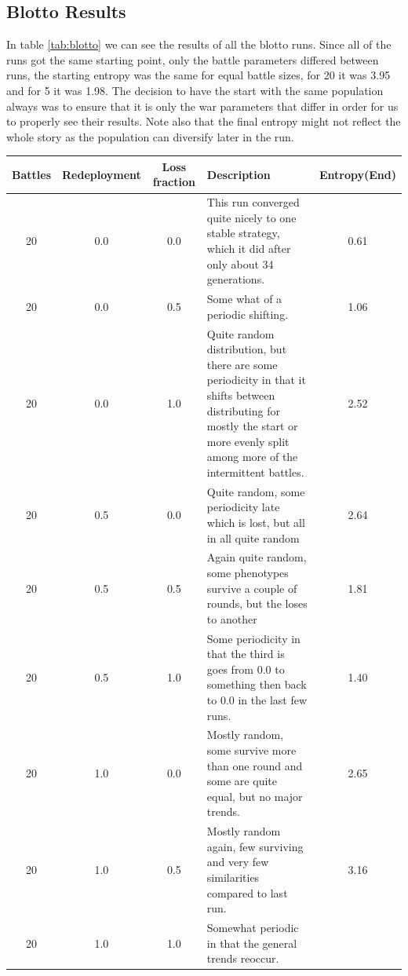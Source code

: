 \subsection{Blotto Results}\label{sec:blotto results}
In table \ref{tab:blotto} we can see the results of all the blotto runs.
Since all of the runs got the same starting point, only the battle parameters
differed between runs, the starting entropy was the same for equal battle sizes,
for 20 it was 3.95 and for 5 it was 1.98. The decision
to have the start with the same population always was to ensure that it is only
the war parameters that differ in order for us to properly see their results.
Note also that the final entropy might not reflect the whole story as the
population can diversify later in the run.

\begin{landscape}
	\begin{table}
		\begin{tabular}{| c | c | c | p{10cm} | c |}
	\hline
	Battles & Redeployment & Loss fraction & Description &
	Entropy(End) \\
	\hline
	\hline
	20 & 0.0 & 0.0 & This run converged quite nicely to one stable strategy,
	which it did after only about 34 generations. & 0.61 \\
	\hline
	20 & 0.0 & 0.5 & Some what of a periodic shifting. & 1.06 \\
	\hline
	20 & 0.0 & 1.0 & Quite random distribution, but there are some
	periodicity in that it shifts between distributing for mostly the start
	or more evenly split among more of the intermittent battles. & 2.52 \\
	\hline
	20 & 0.5 & 0.0 & Quite random, some periodicity late which is lost, but
	   all in all quite random & 2.64 \\
	\hline
	20 & 0.5 & 0.5 & Again quite random, some phenotypes survive a couple of
	   rounds, but the loses to another & 1.81 \\
	\hline
	20 & 0.5 & 1.0 & Some periodicity in that the third is goes from 0.0 to
	 something then back to 0.0 in the last few runs. & 1.40 \\
	\hline
	20 & 1.0 & 0.0 & Mostly random, some survive more than one round and
       some are quite equal, but no major trends. & 2.65 \\
	\hline
	20 & 1.0 & 0.5 & Mostly random again, few surviving and very few
   similarities compared to last run. & 3.16\\
	\hline
	20 & 1.0 & 1.0 & Somewhat periodic in that the general trends reoccur. &

\end{tabular}
\end{table}
\end{landscape}

